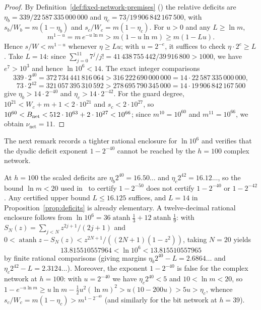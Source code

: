 \begin{proof}
By Definition~\ref{def:fixed-network-premises} (\cite[\S3.6, (10)]{OAI26}) the relative deficits are
$\eta_b=339/22\,587\,335\,000\,000$ and $\eta_c=73/19\,906\,842\,167\,500$, with $s_b/W_b=m(1-\eta_b)$ and
$s_c/W_c=m(1-\eta_c)$. For $u>0$ and any $L\ge\ln m$,
\begin{equation}\label{eq:deficit-test}
  m^{1-u}=m\,e^{-u\ln m}>m(1-u\ln m)\ge m(1-Lu).
\end{equation}
Hence $s/W<m^{1-u}$ whenever $\eta\ge Lu$; with $u=2^{-e}$, it suffices to check $\eta\cdot2^e\ge L$. Take $L=14$:
since $\sum_{j=0}^{11}7^j/j!=41\,438\,755\,442/39\,916\,800>1000$, we have $e^7>10^3$ and hence $\ln 10^6<14$. The
exact integer comparisons
\[
  339\cdot2^{40}=372\,734\,441\,816\,064>316\,222\,690\,000\,000=14\cdot22\,587\,335\,000\,000,
\]
\[
  73\cdot2^{42}=321\,057\,395\,310\,592>278\,695\,790\,345\,000=14\cdot19\,906\,842\,167\,500
\]
give $\eta_b>14\cdot2^{-40}$ and $\eta_c>14\cdot2^{-42}$. For the guard degree, $10^{21}<W_c+m+1<2\cdot10^{21}$ and
$s_c<2\cdot10^{27}$, so $10^{60}<B_{\rm net}<512\cdot10^{63}+2\cdot10^{27}<10^{66}$; since $m^{10}=10^{60}$ and
$m^{11}=10^{66}$, we obtain $\nu_{\mathrm{net}}=11$.
\end{proof}

The next remark records a tighter rational enclosure for $\ln 10^6$ and verifies that the dyadic deficit exponent $1-2^{-40}$ cannot be reached by the $h=100$ complex network.

\begin{remark}\label{rem:deficit-margins}
At $h=100$ the scaled deficits are $\eta_b2^{40}=16.50\ldots$ and $\eta_c2^{42}=16.12\ldots$, so the bound $\ln m<20$
used in~\cite[\S3.6]{OAI26} to certify $1-2^{-50}$ does not certify $1-2^{-40}$ or $1-2^{-42}$. Any certified upper
bound $L\le16.125$ suffices, and $L=14$ in Proposition~\ref{prop:deficits} is already elementary. A twelve-decimal
rational enclosure follows from $\ln10^6=36\operatorname{atanh}\frac13+12\operatorname{atanh}\frac19$: with
$S_N(z)=\sum_{j<N}z^{2j+1}/(2j+1)$ and $0<\operatorname{atanh}z-S_N(z)<z^{2N+1}/((2N+1)(1-z^2))$, taking $N=20$ yields
\[
  13.815510557964<\ln10^6<13.815510557965
\]
by finite rational comparisons (giving margins $\eta_b2^{40}-L=2.6864\ldots$ and $\eta_c2^{42}-L=2.3124\ldots$).
Moreover, the exponent $1-2^{-40}$ is false for the complex network at $h=100$: with $u=2^{-40}$ we have
$\eta_c2^{40}<5$ and $10<\ln m<20$, so $1-e^{-u\ln m}\ge u\ln m-\frac12u^2(\ln m)^2>u(10-200u)>5u>\eta_c$, whence
$s_c/W_c=m(1-\eta_c)>m^{1-2^{-40}}$ (and similarly for the bit network at $h=39$).
\end{remark}


